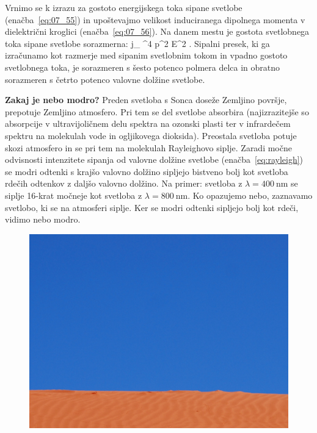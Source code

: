 Vrnimo se k izrazu za gostoto energijskega toka sipane 
svetlobe (enačba~\ref{eq:07_55}) in upoštevajmo velikost induciranega 
dipolnega momenta v dielektrični kroglici (enačba~\ref{eq:07_56}). Na danem
mestu je gostota svetlobnega toka sipane svetlobe sorazmerna:
\beq
j_ \propto \omega^4 p^2 \propto E^2 .
\label{eq:07_17}
\eeq
Sipalni presek, ki ga izračunamo kot razmerje med sipanim svetlobnim tokom in 
vpadno gostoto svetlobnega toka, je sorazmeren s šesto potenco polmera 
delca in obratno sorazmeren s četrto potenco valovne dolžine svetlobe.

\begin{example}{\bf Zakaj je nebo modro?}
Preden svetloba s Sonca doseže Zemljino površje, prepotuje Zemljino atmosfero.
Pri tem se del svetlobe absorbira (najizrazitejše so absorpcije v ultravijoličnem delu 
spektra na ozonski plasti ter v infrardečem spektru na molekulah vode in ogljikovega 
dioksida). Preostala svetloba potuje skozi atmosfero in se pri tem na molekulah
Rayleighovo siplje. Zaradi močne odvisnosti intenzitete sipanja od valovne dolžine 
svetlobe (enačba~\ref{eq:rayleigh}) se modri odtenki s krajšo valovno dolžino 
sipljejo bistveno bolj kot svetloba rdečih odtenkov z daljšo valovno dolžino.
Na primer: svetloba z $\lambda = 400~\si{\nm}$ se siplje 16-krat močneje kot 
svetloba z $\lambda = 800~\si{\nm}$. Ko opazujemo nebo, zaznavamo svetlobo, 
ki se na atmosferi siplje. Ker se modri odtenki sipljejo bolj kot rdeči, 
vidimo nebo modro. 
\begin{figure}[!h]
\centering
\includegraphics[width=7truecm]{slike/07_ModroNebo.jpg}\hfill

\end{figure}
\end{example}
